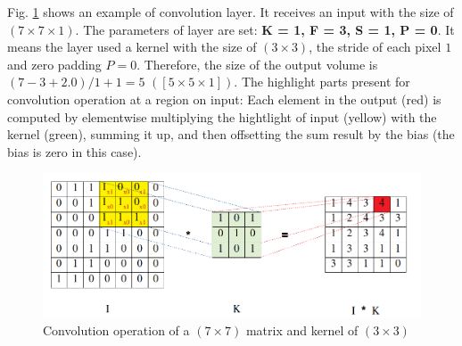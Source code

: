 Fig. \ref{figconv} shows an example of convolution layer. It receives an input with the size of $(7 \times 7 \times 1)$. The parameters of layer are set: \textbf{K = 1, F = 3, S = 1, P = 0}. It means the layer used a kernel with the size of $(3 \times 3)$, the stride of each pixel $1$ and zero padding $P = 0$. Therefore, the size of the output volume is $(7 - 3 + 2.0)/1 + 1 = 5$ $([5 \times 5 \times 1])$. The highlight parts present for convolution operation at a region on input: Each element in the output (red) is computed by elementwise multiplying the hightlight of input (yellow) with the kernel (green), summing it up, and then offsetting the sum result by the bias (the bias is zero in this case).

\begin{figure}[!h]
	\centering
	\includegraphics[scale=0.35]{images/convolutional}
	\caption{Convolution operation of a $(7 \times 7)$ matrix and kernel of $(3 \times 3)$}
	\label{figconv}
\end{figure}

